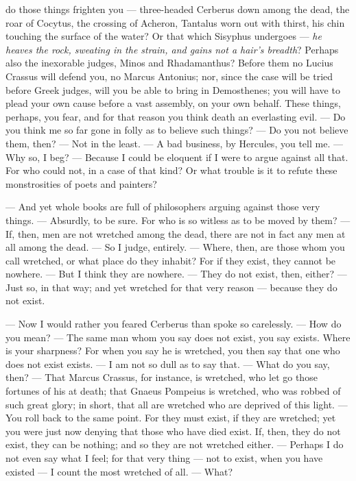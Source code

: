  do those things frighten you — three-headed Cerberus down among the dead, the roar of Cocytus, the crossing of Acheron, Tantalus worn out with thirst, his chin touching the surface of the water? Or that which Sisyphus undergoes — \textit{he heaves the rock, sweating in the strain, and gains not a hair's breadth}? Perhaps also the inexorable judges, Minos and Rhadamanthus? Before them no Lucius Crassus will defend you, no Marcus Antonius; nor, since the case will be tried before Greek judges, will you be able to bring in Demosthenes; you will have to plead your own cause before a vast assembly, on your own behalf. These things, perhaps, you fear, and for that reason you think death an everlasting evil. — Do you think me so far gone in folly as to believe such things? — Do you not believe them, then? — Not in the least. — A bad business, by Hercules, you tell me. — Why so, I beg? — Because I could be eloquent if I were to argue against all that. For who could not, in a case of that kind? Or what trouble is it to refute these monstrosities of poets and painters?

 — And yet whole books are full of philosophers arguing against those very things. — Absurdly, to be sure. For who is so witless as to be moved by them? — If, then, men are not wretched among the dead, there are not in fact any men at all among the dead. — So I judge, entirely. — Where, then, are those whom you call wretched, or what place do they inhabit? For if they exist, they cannot be nowhere. — But I think they are nowhere. — They do not exist, then, either? — Just so, in that way; and yet wretched for that very reason — because they do not exist.

 — Now I would rather you feared Cerberus than spoke so carelessly. — How do you mean? — The same man whom you say does not exist, you say exists. Where is your sharpness? For when you say he is wretched, you then say that one who does not exist exists. — I am not so dull as to say that. — What do you say, then? — That Marcus Crassus, for instance, is wretched, who let go those fortunes of his at death; that Gnaeus Pompeius is wretched, who was robbed of such great glory; in short, that all are wretched who are deprived of this light. — You roll back to the same point. For they must exist, if they are wretched; yet you were just now denying that those who have died exist. If, then, they do not exist, they can be nothing; and so they are not wretched either. — Perhaps I do not even say what I feel; for that very thing — not to exist, when you have existed — I count the most wretched of all. — What?

